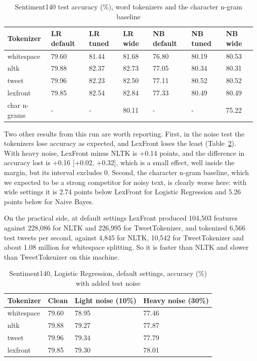 \documentclass[journal,a4paper]{IEEEtran}
\begin{document}
\begin{table}[!tb]
\caption{Sentiment140 test accuracy (\%), word tokenizers and the character n-gram baseline}\label{tab:10}
\centering
\scriptsize
\setlength{\tabcolsep}{3pt}
\begin{tabular}{lllllll}
\toprule
\textbf{Tokenizer} & \textbf{LR default} & \textbf{LR tuned} & \textbf{LR wide} & \textbf{NB default} & \textbf{NB tuned} & \textbf{NB wide} \\
\midrule
whitespace & 79.60 & 81.44 & 81.68 & 76.80 & 80.19 & 80.53 \\
nltk & 79.88 & 82.37 & 82.73 & 77.05 & 80.34 & 80.31 \\
tweet & 79.96 & 82.23 & 82.50 & 77.11 & 80.52 & 80.52 \\
lexfront & 79.85 & 82.54 & 82.84 & 77.33 & 80.49 & 80.49 \\
char n-grams & - & - & 80.11 & - & - & 75.22 \\
\bottomrule
\end{tabular}
\end{table}

Two other results from this run are worth reporting. First, in the noise test the tokenizers lose accuracy as expected, and LexFront loses the least (Table~\ref{tab:11}). With heavy noise, LexFront minus NLTK is +0.14 points, and the difference in accuracy lost is +0.16 [+0.02, +0.32], which is a small effect, well inside the margin, but its interval excludes 0. Second, the character n-gram baseline, which we expected to be a strong competitor for noisy text, is clearly worse here: with wide settings it is 2.74 points below LexFront for Logistic Regression and 5.26 points below for Naive Bayes.

On the practical side, at default settings LexFront produced 104,503 features against 228,086 for NLTK and 226,995 for TweetTokenizer, and tokenized 6,566 test tweets per second, against 4,845 for NLTK, 10,542 for TweetTokenizer and about 1.08 million for whitespace splitting. So it is faster than NLTK and slower than TweetTokenizer on this machine.

\begin{table}[!t]
\caption{Sentiment140, Logistic Regression, default settings, accuracy (\%) with added test noise}\label{tab:11}
\centering
\scriptsize
\setlength{\tabcolsep}{3pt}
\begin{tabular}{llll}
\toprule
\textbf{Tokenizer} & \textbf{Clean} & \textbf{Light noise (10\%)} & \textbf{Heavy noise (30\%)} \\
\midrule
whitespace & 79.60 & 78.95 & 77.46 \\
nltk & 79.88 & 79.27 & 77.87 \\
tweet & 79.96 & 79.34 & 77.79 \\
lexfront & 79.85 & 79.30 & 78.01 \\
\bottomrule
\end{tabular}
\end{table}
\end{document}

